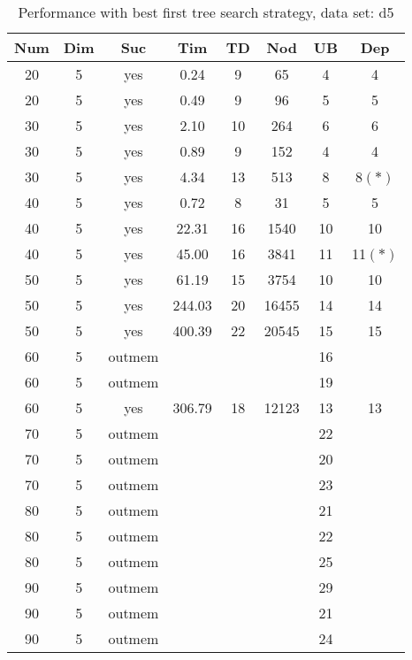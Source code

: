 \begin{table}[!htb]
  \centering
  \begin{tabular}[center]{|c|c|c|c|c|c|c|c|}
    \hline
    Num & Dim & Suc & Tim & TD & Nod & UB & Dep \\
    \hline
    20 & 5 & yes & 0.24 & 9 & 65 & 4 & 4 \\
    20 & 5 & yes & 0.49 & 9 & 96 & 5 & 5 \\
    30 & 5 & yes & 2.10 & 10 & 264 & 6 & 6 \\
    30 & 5 & yes & 0.89 & 9 & 152 & 4 & 4 \\
    30 & 5 & yes & 4.34 & 13 & 513 & 8 & 8$(*)$ \\
    40 & 5 & yes & 0.72 & 8 & 31 & 5 & 5 \\
    40 & 5 & yes & 22.31 & 16 & 1540 & 10 & 10 \\
    40 & 5 & yes & 45.00 & 16 & 3841 & 11 & 11$(*)$ \\
    50 & 5 & yes & 61.19 & 15 & 3754 & 10 & 10 \\
    50 & 5 & yes & 244.03 & 20 & 16455 & 14 & 14 \\
    50 & 5 & yes & 400.39 & 22 & 20545 & 15 & 15 \\
    60 & 5 & outmem &&&& 16 &\\
    60 & 5 & outmem &&&& 19 &\\
    60 & 5 & yes & 306.79 & 18 & 12123 & 13 & 13 \\
    70 & 5 & outmem &&&& 22 &\\
    70 & 5 & outmem &&&& 20 &\\
    70 & 5 & outmem &&&& 23 &\\
    80 & 5 & outmem &&&& 21 &\\
    80 & 5 & outmem &&&& 22 &\\
    80 & 5 & outmem &&&& 25 &\\
    90 & 5 & outmem &&&& 29 &\\
    90 & 5 & outmem &&&& 21 &\\
    90 & 5 & outmem &&&& 24 &\\
    \hline
  \end{tabular}
  \caption{Performance with best first tree search strategy, data set: d5}
  \label{tab:test.sel-d5}
\end{table}

